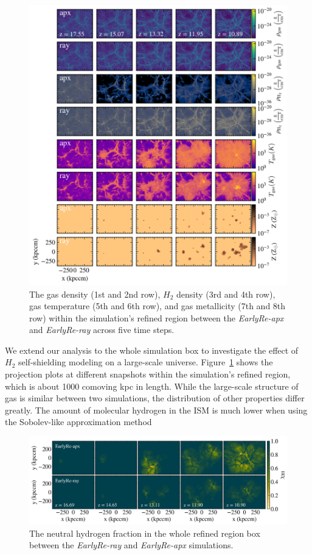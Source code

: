 \documentclass[linenumbers, twocolumn]{aastex631}
\begin{document}
\begin{figure}
    \centering
    \includegraphics[width=\textwidth]{EarlyRe/gas_surface_density_multiple_ver1088_ver2.png}
    \caption{The gas density (1st and 2nd row), $H_{2}$ density (3rd and 4th row), gas temperature (5th and 6th row), and gas metallicity (7th and 8th row) within the simulation's refined region between the \textit{EarlyRe-apx} and \textit{EarlyRe-ray} across five time steps.}
    \label{fig:gas_surface_density_wholebox}
\end{figure}

We extend our analysis to the whole simulation box to investigate the effect of $H_{2}$ self-shielding modeling on a large-scale universe. Figure~\ref{fig:gas_surface_density_wholebox} shows the projection plots at different snapshots within the simulation's refined region, which is about 1000 comoving kpc in length. While the large-scale structure of gas is similar between two simulations, the distribution of other properties differ greatly. The amount of molecular hydrogen in the ISM is much lower when using the Sobolev-like approximation method 

\begin{figure}
    \centering
    \includegraphics[width=\textwidth]{EarlyRe/neutralHfraction_comparison_multiple.png}
    \caption{The neutral hydrogen fraction in the whole refined region box between the \textit{EarlyRe-ray} and \textit{EarlyRe-apx} simulations.}
    \label{fig:neutralHfrac_map}
\end{figure}
\end{document}
